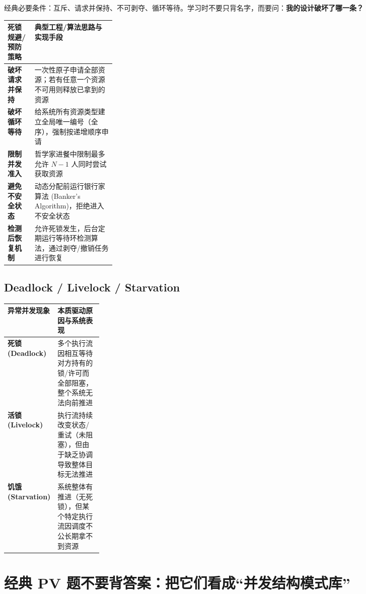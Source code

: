 \documentclass[11pt,a4paper]{ctexart}
\newcommand{\kw}[1]{\textbf{#1}}
\begin{document}
经典必要条件：互斥、请求并保持、不可剥夺、循环等待。学习时不要只背名字，而要问：\kw{我的设计破坏了哪一条？}

\begingroup
\small
\renewcommand{\arraystretch}{1.25}
\setlength{\tabcolsep}{6pt}
\begin{tabularx}{\linewidth}{>{\bfseries}p{0.25\linewidth} X}
\toprule
死锁规避/预防策略 & 典型工程/算法思路与实现手段\\
\midrule
破坏请求并保持 & 一次性原子申请全部资源；若有任意一个资源不可用则释放已拿到的资源\\
破坏循环等待 & 给系统所有资源类型建立全局唯一编号（全序），强制按递增顺序申请\\
限制并发准入 & 哲学家进餐中限制最多允许 $N-1$ 人同时尝试获取资源\\
避免不安全状态 & 动态分配前运行银行家算法 (Banker's Algorithm)，拒绝进入不安全状态\\
检测后恢复机制 & 允许死锁发生，后台定期运行等待环检测算法，通过剥夺/撤销任务进行恢复\\
\bottomrule
\end{tabularx}
\endgroup

\subsection{Deadlock / Livelock / Starvation}

\begingroup
\small
\renewcommand{\arraystretch}{1.25}
\setlength{\tabcolsep}{6pt}
\begin{tabularx}{\linewidth}{>{\bfseries}p{0.22\linewidth} X}
\toprule
异常并发现象 & 本质驱动原因与系统表现\\
\midrule
死锁 (Deadlock) & 多个执行流因相互等待对方持有的锁/许可而全部阻塞，整个系统无法向前推进\\
活锁 (Livelock) & 执行流持续改变状态/重试（未阻塞），但由于缺乏协调导致整体目标无法推进\\
饥饿 (Starvation) & 系统整体有推进（无死锁），但某个特定执行流因调度不公长期拿不到资源\\
\bottomrule
\end{tabularx}
\endgroup

\section{经典 PV 题不要背答案：把它们看成“并发结构模式库”}
\end{document}
